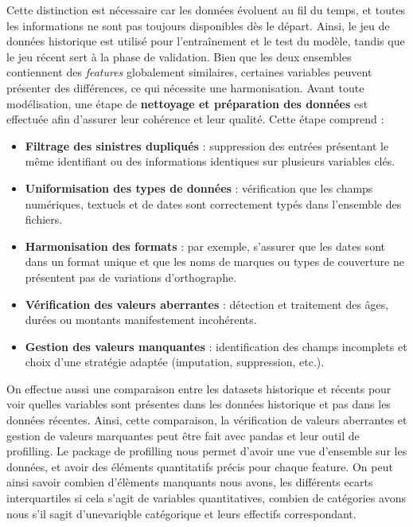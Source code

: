 \documentclass [twoside,openright,a4paper,11pt,french] {report}
\begin{document}
Cette distinction est nécessaire car les données évoluent au fil du temps, et toutes les informations ne sont pas toujours disponibles dès le départ.  
Ainsi, le jeu de données \og historique \fg{} est utilisé pour l'entraînement et le test du modèle, tandis que le jeu \og récent \fg{} sert à la phase de validation.  
Bien que les deux ensembles contiennent des \textit{features} globalement similaires, certaines variables peuvent présenter des différences, ce qui nécessite une harmonisation.
Avant toute modélisation, une étape de \textbf{nettoyage et préparation des données} est effectuée afin d'assurer leur cohérence et leur qualité. Cette étape comprend :

\begin{itemize}
    \item \textbf{Filtrage des sinistres dupliqués} : suppression des entrées présentant le même identifiant ou des informations identiques sur plusieurs variables clés.
    \item \textbf{Uniformisation des types de données} : vérification que les champs numériques, textuels et de dates sont correctement typés dans l'ensemble des fichiers.
    \item \textbf{Harmonisation des formats} : par exemple, s'assurer que les dates sont dans un format unique et que les noms de marques ou types de couverture ne présentent pas de variations d'orthographe.
    \item \textbf{Vérification des valeurs aberrantes} : détection et traitement des âges, durées ou montants manifestement incohérents.
    \item \textbf{Gestion des valeurs manquantes} : identification des champs incomplets et choix d'une stratégie adaptée (imputation, suppression, etc.).
\end{itemize}

On effectue aussi une comparaison entre les datasets historique et récents pour voir quelles variables sont présentes dans les 
données historique et pas dans les données récentes. Ainsi, cette comparaison, la vérification de valeurs aberrantes et gestion de valeurs marquantes 
peut être fait avec pandas et leur outil de profilling. Le package de profilling nous permet 
d'avoir une vue d'ensemble sur les données, et avoir des éléments quantitatifs précis pour chaque feature. On peut ainsi savoir combien 
d'élèments manquants nous avons, les différents ecarts interquartiles si cela s'agit de variables quantitatives, combien de catégories avons nous s'il sagit d'unevariqble 
catégorique et leurs effectifs correspondant. 
\end{document}
